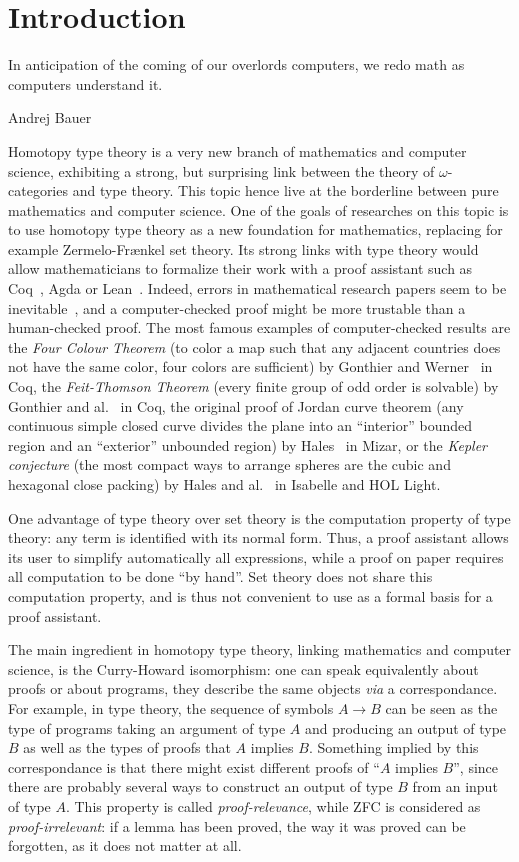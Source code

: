 \chapter{Introduction}
\label{chap:intro}
\epigraph{In anticipation of the coming of our overlords computers, we
  redo math as computers understand it.}{Andrej Bauer}

Homotopy type theory is a very new branch of mathematics and computer
science, exhibiting a strong, but surprising link between the theory
of $\omega$-categories and type theory. This topic hence live at the
borderline between pure mathematics and computer science. One of the
goals of researches on this topic is to use homotopy type theory as a
new foundation for mathematics, replacing for example Zermelo-Frænkel
set theory. Its strong links with type theory would allow
mathematicians to formalize their work with a proof assistant such as
Coq~\cite{coq:refman:8.4}, Agda\cite{norell2007towards} or
Lean~\cite{lean}. Indeed, errors in mathematical research papers seem
to be inevitable~\cite{vv-univ-f}, and a computer-checked proof might
be more trustable than a human-checked proof.
The most famous examples of computer-checked results are the {\em Four
  Colour Theorem} (to color a map such that any adjacent countries
does not have the same color, four colors are sufficient) by Gonthier
and Werner~\cite{gonthier-four-color} in Coq, the {\em Feit-Thomson
  Theorem} (every finite group of odd order is solvable) by Gonthier
and al.~\cite{gonthier-feit} in Coq, the original proof of Jordan curve
theorem (any continuous simple closed curve divides the plane into an
``interior'' bounded region and an ``exterior'' unbounded region) by
Hales~\cite{hales-jordan} in Mizar, or the {\em Kepler conjecture}
(the most compact ways to arrange spheres are the cubic and hexagonal close
packing) by Hales and al.~\cite{hales-kepler} in Isabelle and HOL Light.

One advantage of type theory over set theory is the computation
property of type theory: any term is identified with its normal
form. Thus, a proof assistant allows its user to simplify
automatically all expressions, while a proof on paper requires all
computation to be done ``by hand''. Set theory does not share this
computation property, and is thus not convenient to use as a formal
basis for a proof assistant.

The main ingredient in homotopy type theory, linking mathematics and
computer science, is the Curry-Howard isomorphism: one can speak
equivalently about proofs or about programs, they describe the same
objects {\em via} a correspondance. For example, in type theory, the
sequence of symbols $A\to B$ can be seen as the type of programs
taking an argument of type $A$ and producing an output of type $B$ as
well as the types of proofs that $A$ implies $B$. Something implied by
this correspondance is that there might exist different proofs of
``$A$ implies $B$'', since there are probably several ways to
construct an output of type $B$ from an input of type $A$. This
property is called {\em proof-relevance}, while ZFC is considered as
{\em proof-irrelevant}: if a lemma has been proved, the way it was
proved can be forgotten, as it does not matter at all.

